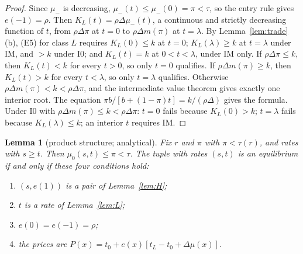 \documentclass[11pt]{article}
\newtheorem{lemma}{Lemma}
\theoremstyle{definition}
\begin{document}
\begin{proof}
Since $\mu_-$ is decreasing, $\mu_-(t)\le\mu_-(0)=\pi<\tau$, so the entry rule gives $e(-1)=\rho$. Then
$K_L(t)=\rho\Delta\mu_-(t)$, a continuous and strictly decreasing function of $t$, from $\rho\Delta\pi$ at $t=0$ to
$\rho\Delta m(\pi)$ at $t=\lambda$. By Lemma~\ref{lem:trade}(b), (E5) for class $L$ requires $K_L(0)\le k$ at
$t=0$; $K_L(\lambda)\ge k$ at $t=\lambda$ under IM, and $>k$ under I0; and $K_L(t)=k$ at $0<t<\lambda$, under IM
only. If $\rho\Delta\pi\le k$, then $K_L(t)<k$ for every $t>0$, so only $t=0$ qualifies. If $\rho\Delta m(\pi)\ge k$,
then $K_L(t)>k$ for every $t<\lambda$, so only $t=\lambda$ qualifies. Otherwise $\rho\Delta m(\pi)<k<\rho\Delta\pi$,
and the intermediate value theorem gives exactly one interior root. The equation
$\pi b/[b+(1-\pi)t]=k/(\rho\Delta)$ gives the formula. Under I0 with $\rho\Delta m(\pi)\le k<\rho\Delta\pi$: $t=0$
fails because $K_L(0)>k$; $t=\lambda$ fails because $K_L(\lambda)\le k$; an interior $t$ requires IM.
\end{proof}

\begin{lemma}[product structure; analytical]\label{lem:product}
Fix $r$ and $\pi$ with $\pi<\tau(r)$, and rates with $s\ge t$. Then $\mu_0(s,t)\le\pi<\tau$. The tuple with
rates $(s,t)$ is an equilibrium if and only if these four conditions hold:
\begin{enumerate}[label=(\roman*)]
\item $(s,e(1))$ is a pair of Lemma~\ref{lem:H};
\item $t$ is a rate of Lemma~\ref{lem:L};
\item $e(0)=e(-1)=\rho$;
\item the prices are $P(x)=t_0+e(x)[t_L-t_0+\Delta\mu(x)]$.
\end{enumerate}
\end{lemma}
\end{document}
